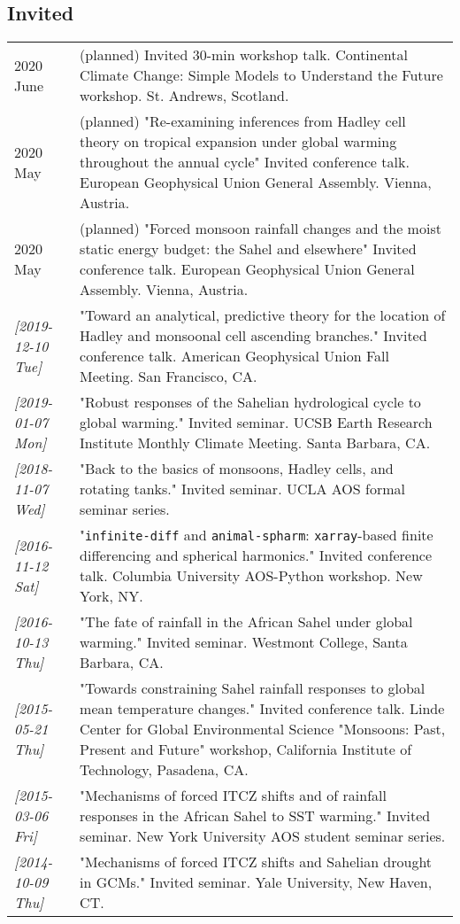 \documentclass[12pt,letterpaper]{shillcv}
\begin{document}
\subsection*{Invited}
\label{sec:orgb6723ca}
\begin{center}
\begin{tabularx}{\textwidth}{lX}
2020 June & (planned) Invited 30-min workshop talk.  Continental Climate Change: Simple Models to Understand the Future workshop.  St. Andrews, Scotland.\\
2020 May & (planned) "Re-examining inferences from Hadley cell theory on tropical expansion under global warming throughout the annual cycle" Invited conference talk.  European Geophysical Union General Assembly.  Vienna, Austria.\\
2020 May & (planned) "Forced monsoon rainfall changes and the moist static energy budget: the Sahel and elsewhere" Invited conference talk.  European Geophysical Union General Assembly.  Vienna, Austria.\\
\textit{[2019-12-10 Tue]} & "Toward an analytical, predictive theory for the location of Hadley and monsoonal cell ascending branches."  Invited conference talk.  American Geophysical Union Fall Meeting.  San Francisco, CA.\\
\textit{[2019-01-07 Mon]} & "Robust responses of the Sahelian hydrological cycle to global warming."  Invited seminar.  UCSB Earth Research Institute Monthly Climate Meeting.  Santa Barbara, CA.\\
\textit{[2018-11-07 Wed]} & "Back to the basics of monsoons, Hadley cells, and rotating tanks."  Invited seminar.  UCLA AOS formal seminar series.\\
\textit{[2016-11-12 Sat]} & "\texttt{infinite-diff} and \texttt{animal-spharm}: \texttt{xarray}-based finite differencing and spherical harmonics."  Invited conference talk.  Columbia University AOS-Python workshop.  New York, NY.\\
\textit{[2016-10-13 Thu]} & "The fate of rainfall in the African Sahel under global warming."  Invited seminar.  Westmont College, Santa Barbara, CA.\\
\textit{[2015-05-21 Thu]} & "Towards constraining Sahel rainfall responses to global mean temperature changes."  Invited conference talk.  Linde Center for Global Environmental Science "Monsoons: Past, Present and Future" workshop, California Institute of Technology, Pasadena, CA.\\
\textit{[2015-03-06 Fri]} & "Mechanisms of forced ITCZ shifts and of rainfall responses in the African Sahel to SST warming."  Invited seminar.  New York University AOS student seminar series.\\
\textit{[2014-10-09 Thu]} & "Mechanisms of forced ITCZ shifts and Sahelian drought in GCMs."  Invited seminar.  Yale University, New Haven, CT.\\
\end{tabularx}
\end{center}
\end{document}
